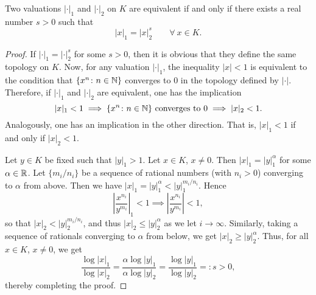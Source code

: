 \begin{proposition}
    Two valuations $|\cdot|_1$ and $|\cdot|_2$ on $K$ are equivalent if and only if there exists a real number $s > 0$ such that 
    \begin{equation*}
        |x|_1 = |x|_2^s\qquad\forall~x\in K.
    \end{equation*}
\end{proposition}
\begin{proof}
    If $|\cdot|_1 = |\cdot|_2^s$ for some $s > 0$, then it is obvious that they define the same topology on $K$. Now, for any valuation $|\cdot|_1$, the inequality $|x| < 1$ is equivalent to the condition that $\{x^n\colon n\in\mathbb{N}\}$ converges to $0$ in the topology defined by $|\cdot|$. Therefore, if $|\cdot|_1$ and $|\cdot|_2$ are equivalent, one has the implication 
    \begin{equation*}
        |x|_1 < 1\implies\{x^n\colon n\in\mathbb{N}\}\text{ converges to }0\implies |x|_2 < 1.
    \end{equation*}
    Analogously, one has an implication in the other direction. That is, $|x|_1 < 1$ if and only if $|x|_2 < 1$.

    Let $y\in K$ be fixed such that $|y|_1 > 1$. Let $x\in K$, $x\ne 0$. Then $|x|_1 = |y|_1^\alpha$ for some $\alpha\in\mathbb{R}$. Let $\{m_i/n_i\}$ be a sequence of rational numbers (with $n_i > 0$) converging to $\alpha$ from above. Then we have $|x|_1 = |y|_1^\alpha < |y|_1^{m_i/n_i}$. Hence 
    \begin{equation*}
        \left|\frac{x^{n_i}}{y^{m_i}}\right|_1 < 1 \implies\left|\frac{x^{n_i}}{y^{m_i}}\right| < 1,
    \end{equation*}
    so that $|x|_2 < |y|_2^{m_i/n_i}$, and thus $|x|_2\le |y|_2^\alpha$ as we let $i\to\infty$. Similarly, taking a sequence of rationals converging to $\alpha$ from below, we get $|x|_2\ge|y|_2^\alpha$. Thus, for all $x\in K$, $x\ne 0$, we get 
    \begin{equation*}
        \frac{\log |x|_1}{\log |x|_2} = \frac{\alpha\log |y|_1}{\alpha\log |y|_2} = \frac{\log |y|_1}{\log |y|_2} =: s > 0,
    \end{equation*}
    thereby completing the proof.
\end{proof}

